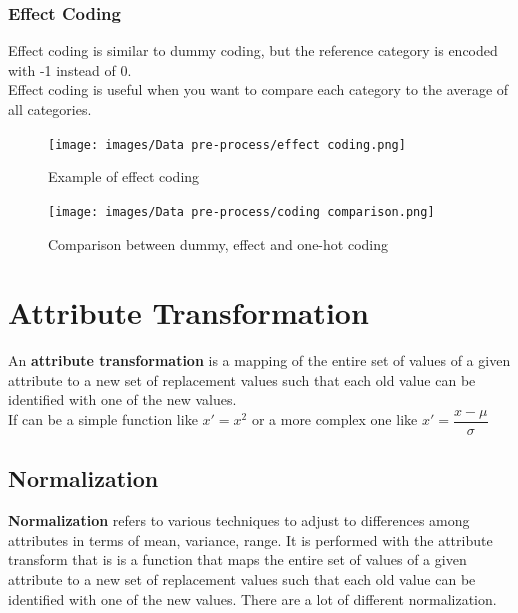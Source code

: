 \subsubsection{Effect Coding}
Effect coding is similar to dummy coding, but the reference category 
is encoded with -1 instead of 0.\\ 
Effect coding is useful when you want to compare each category to the 
average of all categories.

\begin{figure}[H]
  \centering
  \texttt{[image: images/Data
  pre-process/effect coding.png]}
  \caption{Example of effect coding}
  \label{fig:effect-coding}
\end{figure}

\begin{figure}[H]
  \centering
  \texttt{[image: images/Data
  pre-process/coding comparison.png]}
  \caption{Comparison between dummy, effect and one-hot coding}
\end{figure}

\section{Attribute Transformation}
An \textbf{attribute transformation} is a mapping of the entire set of
values of a given attribute to a new set of replacement values such 
that each old value can be identified with one of the new values.\\ 
If can be a simple function like $x' = x^2$ or a more complex one like 
$ x' = \dfrac{x-\mu}{\sigma}$


\subsection{Normalization}

\textbf{Normalization} refers to various techniques to adjust to
differences among attributes in terms of mean, variance, range. It is
performed with the attribute transform that is is a function that maps
the entire set of values of a given attribute to a new set of
replacement values such that each old value can be identified with one
of the new values. There are a lot of different normalization.
